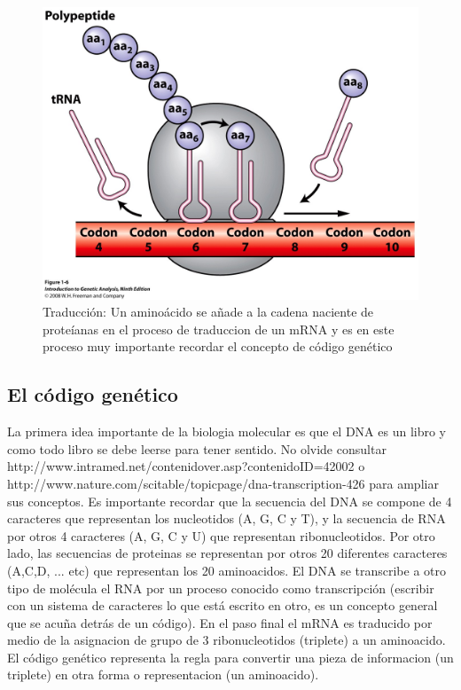 \documentclass[10pt]{article}
\begin{document}
\begin{figure}[htb!]
\includegraphics[scale=0.3]{./figures/figure06.jpg}
\caption{Traducción:
Un aminoácido se añade a la cadena naciente de proteíanas en el proceso
de traduccion de un mRNA y es en este proceso muy importante recordar el concepto de código genético}
\end{figure}


\newpage


\subsection{El código genético}
La primera idea importante de la biologia molecular es que el DNA es un libro
y como todo libro se debe leerse para tener sentido. No olvide consultar
http://www.intramed.net/contenidover.asp?contenidoID=42002 o \newline
http://www.nature.com/scitable/topicpage/dna-transcription-426 para ampliar
sus conceptos. Es importante recordar que la secuencia del DNA se compone
de 4 caracteres que representan los nucleotidos (A, G, C y T), y la secuencia
de RNA por otros 4 caracteres (A, G, C y U) que representan ribonucleotidos.
Por otro lado, las secuencias de proteinas se representan por otros 20 diferentes
caracteres (A,C,D, ... etc) que representan los 20 aminoacidos. El DNA se
transcribe a otro tipo de molécula el RNA por un proceso conocido
como transcripción (escribir con un sistema de caracteres lo que está escrito
en otro, es un concepto general que se acuña detrás de un código). En el paso final el mRNA es traducido por medio de la asignacion
de grupo de 3 ribonucleotidos (triplete) a un aminoacido.  El código genético
representa la regla para convertir una pieza de informacion (un triplete) en otra
forma o representacion (un aminoacido).
\end{document}
